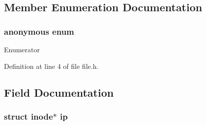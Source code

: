 \subsection{Member Enumeration Documentation}
\hypertarget{structfile_adc29c2ff13d900c2f185ee95427fb06c}{\subsubsection[{anonymous enum}]{\setlength{\rightskip}{0pt plus 5cm}anonymous enum}}\label{structfile_adc29c2ff13d900c2f185ee95427fb06c}
\begin{Desc}
\item[Enumerator]\par
\begin{description}
\item[{\em 
\hypertarget{structfile_adc29c2ff13d900c2f185ee95427fb06ca949fd72b27639c27329b150ec9de33cd}{F\-D\-\_\-\-N\-O\-N\-E}\label{structfile_adc29c2ff13d900c2f185ee95427fb06ca949fd72b27639c27329b150ec9de33cd}
}]\item[{\em 
\hypertarget{structfile_adc29c2ff13d900c2f185ee95427fb06caab625bb8391962abb9337db42d7909d6}{F\-D\-\_\-\-P\-I\-P\-E}\label{structfile_adc29c2ff13d900c2f185ee95427fb06caab625bb8391962abb9337db42d7909d6}
}]\item[{\em 
\hypertarget{structfile_adc29c2ff13d900c2f185ee95427fb06ca45efb38f6972a89c2237550ef6cd542c}{F\-D\-\_\-\-I\-N\-O\-D\-E}\label{structfile_adc29c2ff13d900c2f185ee95427fb06ca45efb38f6972a89c2237550ef6cd542c}
}]\end{description}
\end{Desc}


Definition at line 4 of file file.\-h.



\subsection{Field Documentation}
\hypertarget{structfile_a3ab9ee7e2cad8f73ff4bf973ad8d7713}{
\subsubsection[{ip}]{\setlength{\rightskip}{0pt plus 5cm}struct {\bf inode}$\ast$ ip}}\label{structfile_a3ab9ee7e2cad8f73ff4bf973ad8d7713}


